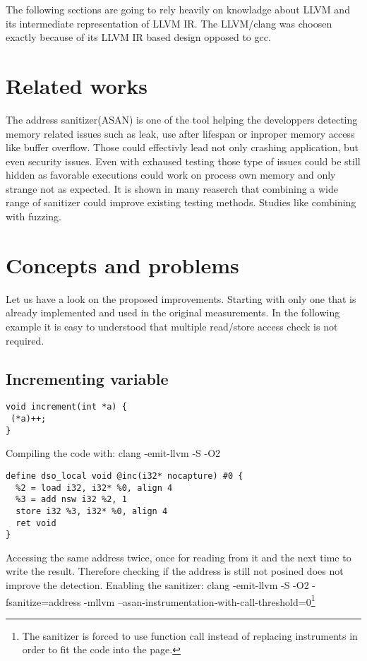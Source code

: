 \documentclass[letterpaper, 10 pt]{llncs}
\let\cite\parencite
\begin{document}
The following sections are going to rely heavily on knowladge about LLVM\cite{lattner2008llvm} and its intermediate representation of LLVM IR\cite{llvm-ir}. The LLVM/clang was choosen exactly because of its LLVM IR based design opposed to gcc.

\section{Related works}

The address sanitizer(ASAN) is one of the tool helping the developpers detecting memory related issues such as leak, use after lifespan or inproper memory access like buffer overflow. Those could effectivly lead not only crashing application, but even security issues. Even with exhaused testing those type of issues could be still hidden as favorable executions could work on process own memory and only strange not as expected. It is shown in many reaserch that combining a wide range of sanitizer could improve existing testing methods. Studies like combining with fuzzing\cite{alkazimi2016heartbleed}\cite{bohme2017directed}.

\section{Concepts and problems}


Let us have a look on the proposed\cite{serebryany2012addresssanitizer} improvements. Starting with only one that is already implemented and used in the original measurements. In the following example it is easy to understood that multiple read/store access check is not required.

\subsection{Incrementing variable}

\begin{verbatim}
void increment(int *a) {
 (*a)++;
}
\end{verbatim}

Compiling the code with: clang -emit-llvm -S -O2
\begin{verbatim}
define dso_local void @inc(i32* nocapture) #0 {
  %2 = load i32, i32* %0, align 4
  %3 = add nsw i32 %2, 1
  store i32 %3, i32* %0, align 4
  ret void
}
\end{verbatim}

Accessing the same address twice, once for reading from it and the next time to write the result. Therefore checking if the address is still not posined does not improve the detection. 
Enabling the sanitizer: clang -emit-llvm -S -O2 -fsanitize=address -mllvm --asan-instrumentation-with-call-threshold=0\footnote{The sanitizer is forced to use function call instead of replacing instruments in order to fit the code into the page.}
\end{document}
